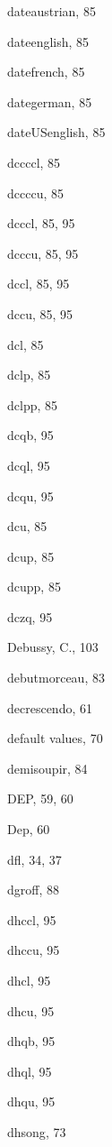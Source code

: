 \begin{theindex}
  \item {\Bslash dateaustrian}, 85
  \item {\Bslash dateenglish}, 85
  \item {\Bslash datefrench}, 85
  \item {\Bslash dategerman}, 85
  \item {\Bslash dateUSenglish}, 85
  \item {\Bslash dccccl}, 85
  \item {\Bslash dccccu}, 85
  \item {\Bslash dcccl}, 85, 95
  \item {\Bslash dcccu}, 85, 95
  \item {\Bslash dccl}, 85, 95
  \item {\Bslash dccu}, 85, 95
  \item {\Bslash dcl}, 85
  \item {\Bslash dclp}, 85
  \item {\Bslash dclpp}, 85
  \item {\Bslash dcqb}, 95
  \item {\Bslash dcql}, 95
  \item {\Bslash dcqu}, 95
  \item {\Bslash dcu}, 85
  \item {\Bslash dcup}, 85
  \item {\Bslash dcupp}, 85
  \item {\Bslash dczq}, 95
  \item {\sc Debussy, C.}, 103
  \item {\Bslash debutmorceau}, 83
  \item {\Bslash decrescendo}, 61
  \item default values, 70
  \item {\Bslash demisoupir}, 84
  \item {\Bslash DEP}, 59, 60
  \item {\Bslash Dep}, 60
  \item {\Bslash dfl}, 34, 37
  \item {\Bslash dgroff}, 88
  \item {\Bslash dhccl}, 95
  \item {\Bslash dhccu}, 95
  \item {\Bslash dhcl}, 95
  \item {\Bslash dhcu}, 95
  \item {\Bslash dhqb}, 95
  \item {\Bslash dhql}, 95
  \item {\Bslash dhqu}, 95
  \item {\Bslash dhsong}, 73

\end{theindex}

